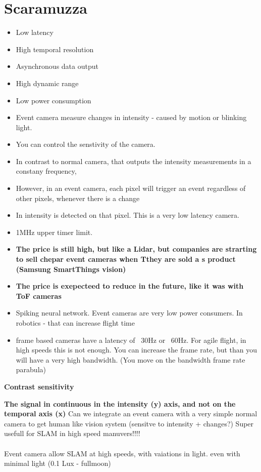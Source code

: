 \documentclass{article}
\begin{document}
\section{Scaramuzza}
\begin{itemize}
    \item Low latency
    \item High temporal resolution
    \item Asynchronous data output
    \item High dynamic range
    \item Low power consumption
    \item Event camera measure changes in intensity - caused by motion or blinking light.
    \item You can control the senstivity of the camera.
    \item In contrast to normal camera, that outputs the intensity measurements in a constany frequency,
    \item However, in an event camera, each pixel will trigger an event regardless of other pixels, whenever there is a change 
    \item In intensity is detected on that pixel. This is a very low latency camera.
    \item 1MHz upper timer limit.
    \item \textbf{The price is still high, but like a Lidar, but companies are strarting to sell chepar event cameras
                    when Tthey are sold a s product (Samsung SmartThings vision)}
    \item \textbf{The price is exepecteed to reduce in the future, like it was with ToF cameras}
    \item Spiking neural network. Event cameras are very low power consumers. In robotics - that can increase flight time
    \item frame based cameras have a latency of ~30Hz or ~60Hz. For agile flight, in high speeds this is not enough.
            You can increase the frame rate, but than you will have a very high bandwidth. (You move on the bandwidth frame rate parabula) 
\end{itemize}

\textbf{Contrast sensitivity}

\textbf{The signal in continuous in the intensity (y) axis, and not on the temporal axis (x)}
    Can we integrate an event camera with a very simple normal camera to get human like vision system (sensitve to intensity + changes?)
    Super usefull for SLAM in high speed manuvers!!!!
\\
\\
Event camera allow SLAM at high speeds, with vaiations in light. even with minimal light (0.1 Lux - fullmoon)
\end{document}
